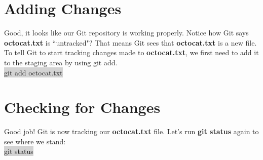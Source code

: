 \documentclass{article}
\begin{document}
\section{ Adding Changes}
\begin{minipage}[c]{0.66\textwidth}
	\parbox{\textwidth}{
		Good, it looks like our Git repository is working properly. Notice how Git says \textbf{octocat.txt} is ``untracked"? That means Git sees that \textbf{octocat.txt} is a new file.\\
		To tell Git to start tracking changes made to \textbf{octocat.txt}, we first need to add it to the staging area by using git add.\\
		\colorbox{lightgray}{git add octocat.txt}\\
	}%
\end{minipage}
\hfill
\begin{minipage}[c]{0.32\textwidth}
\end{minipage}

\section{Checking for Changes}
\begin{minipage}[c]{0.66\textwidth}
	\parbox{\textwidth}{
		Good job! Git is now tracking our \textbf{octocat.txt} file. Let's run \textbf{git status} again to see where we stand:\\
		\colorbox{lightgray}{git status}
	}
\end{minipage}
\hfill
\begin{minipage}[c]{0.32\textwidth}
\end{minipage}
\end{document}
